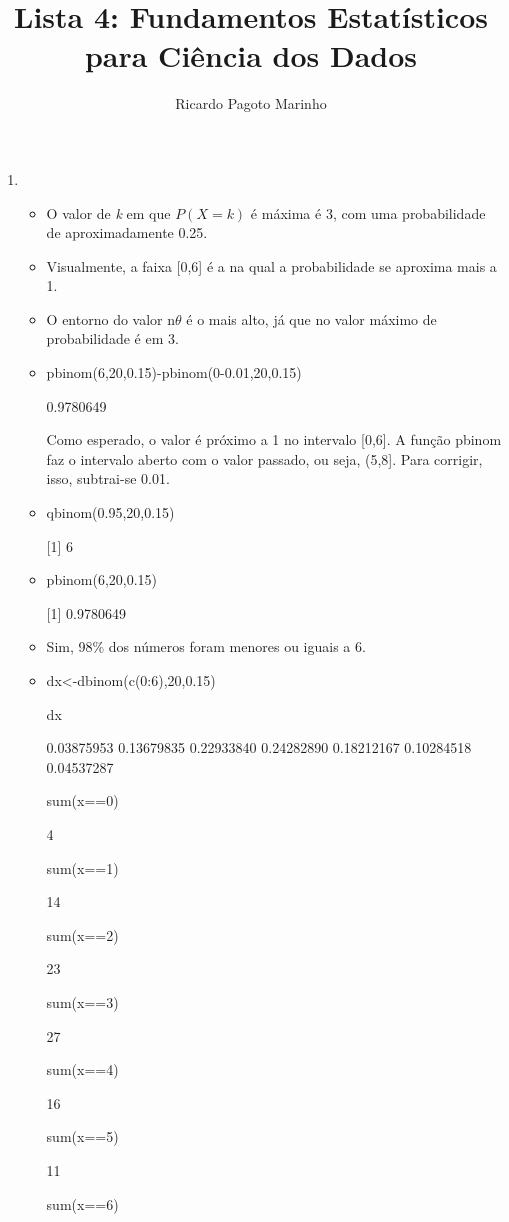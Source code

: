 \documentclass[11pt,a4paper]{book}
\title{Lista 4: Fundamentos Estatísticos para Ciência dos Dados}
\author{Ricardo Pagoto Marinho}
\begin{document}
\maketitle
	\begin{enumerate}
		\item
			\begin{itemize}
				\item O valor de \textit{k} em que $P(X=k)$ é máxima é 3, com uma probabilidade de aproximadamente 0.25.
				\item Visualmente, a faixa [0,6] é a na qual a probabilidade se aproxima mais a 1.
				\item O entorno do valor n$\theta$ é o mais alto, já que no valor máximo de probabilidade é em 3.
				\item pbinom(6,20,0.15)-pbinom(0-0.01,20,0.15)
				
				0.9780649
				
				Como esperado, o valor é próximo a 1 no intervalo [0,6].
				A função pbinom faz o intervalo aberto com o valor passado, ou seja, (5,8].
				Para corrigir, isso, subtrai-se 0.01.
				\item qbinom(0.95,20,0.15)
				
				[1] 6
				
				\item pbinom(6,20,0.15)

				[1] 0.9780649
				
				\item
				Sim, 98\% dos números foram menores ou iguais a 6.
				
				\item dx<-dbinom(c(0:6),20,0.15)
				
				dx
				
				0.03875953 0.13679835 0.22933840 0.24282890 0.18212167 0.10284518 0.04537287
				
				sum(x==0)

				4
				
				sum(x==1)
				
				14
				
				sum(x==2)
				
				23
				
				sum(x==3)
				
				27
				
				sum(x==4)
				
				16
				
				sum(x==5)
				
				11
				
				sum(x==6)
				

\end{itemize}
\end{enumerate}
\end{document}

